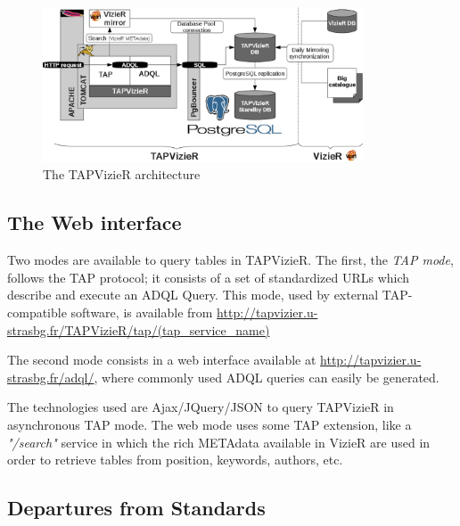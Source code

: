\begin{figure}[hbp] \center
\includegraphics[width=0.85\textwidth]{part8/Landais_P44/P044_fig1.eps}
\caption{The TAPVizieR architecture}\label{P044:architecture}
\end{figure}

\subsection{The Web interface}
\label{P044:web_interface}
Two modes are available to query tables in TAPVizieR. The first, the {\em {}TAP mode}, follows the TAP protocol; it consists of a set of standardized URLs which describe and execute an ADQL Query. This mode, used by external TAP-compatible software, is available from {\small\url{http://tapvizier.u-strasbg.fr/TAPVizieR/tap/(tap_service_name)}}

The second mode consists in a web interface available at {\small\url{http://tapvizier.u-strasbg.fr/adql/}}, where commonly used ADQL queries can easily be generated.

The technologies used are Ajax/JQuery/JSON to query TAPVizieR in asynchronous TAP mode. The web mode uses some TAP extension, like a \textit{"/search"} service in which the rich METAdata available in VizieR are used in order to retrieve tables from position, keywords, authors, etc.


\subsection{Departures from Standards}

